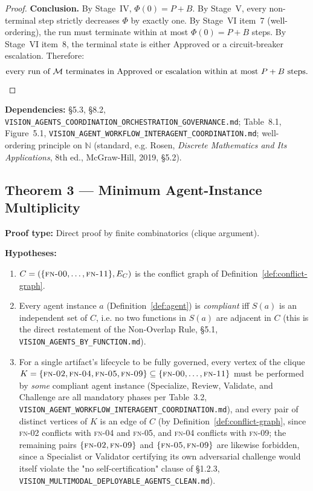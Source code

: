 \documentclass[12pt]{article}
\theoremstyle{definition}
\newcommand{\code}[1]{\texttt{#1}}
\newcommand{\FN}[1]{\textsc{fn-#1}}
\newcommand{\VisionClean}{\code{VISION\_MULTIMODAL\_\allowbreak DEPLOYABLE\_\allowbreak AGENTS\_CLEAN.md}}
\newcommand{\VisionGov}{\code{VISION\_AGENTS\_\allowbreak COORDINATION\_\allowbreak ORCHESTRATION\_\allowbreak GOVERNANCE.md}}
\newcommand{\VisionFunc}{\code{VISION\_AGENTS\_\allowbreak BY\_FUNCTION.md}}
\newcommand{\VisionFlow}{\code{VISION\_AGENT\_\allowbreak WORKFLOW\_\allowbreak INTERAGENT\_\allowbreak COORDINATION.md}}
\begin{document}
\begin{proof}
\medskip
\noindent\textbf{Conclusion.}
By Stage~IV, $\Phi(0) = P + B$.  By Stage~V, every non-terminal step
strictly decreases $\Phi$ by exactly one.  By Stage~VI item~7
(well-ordering), the run must terminate within at most $\Phi(0) = P + B$
steps.  By Stage~VI item~8, the terminal state is either
$\mathrm{Approved}$ or a circuit-breaker escalation.  Therefore:
\begin{equation}
  \label{eq:conclusion}
  \text{every run of } \mathcal{M}
  \text{ terminates in } \mathrm{Approved}
  \text{ or escalation within at most } P + B
  \text{ steps.} \qedhere
\end{equation}
\end{proof}

\begin{sloppypar}
\textbf{Dependencies:} \S5.3, \S8.2,
\VisionGov{}; Table~8.1,
Figure~5.1, \VisionFlow{};
well-ordering principle on $\mathbb{N}$ (standard, e.g. Rosen,
\emph{Discrete Mathematics and Its Applications}, 8th ed., McGraw-Hill,
2019, \S5.2).
\end{sloppypar}

\subsection{Theorem 3 --- Minimum Agent-Instance Multiplicity}

\textbf{Proof type:} Direct proof by finite combinatorics (clique
argument).

\textbf{Hypotheses:}
\begin{enumerate}
    \item[H1] $C = (\{\FN{00},\ldots,\FN{11}\}, E_C)$ is the conflict
              graph of Definition~\ref{def:conflict-graph}.
    \item[H2] Every agent instance $a$ (Definition~\ref{def:agent}) is
              \emph{compliant} iff $S(a)$ is an independent set of $C$,
              i.e. no two functions in $S(a)$ are adjacent in $C$ (this is
              the direct restatement of the Non-Overlap Rule, \S5.1,
              \VisionFunc{}).
    \item[H3] For a single artifact's lifecycle to be fully governed, every
              vertex of the clique
              $K = \{\FN{02},\FN{04},\FN{05},\FN{09}\} \subseteq
              \{\FN{00},\ldots,\FN{11}\}$ must be performed by
              \emph{some} compliant agent instance (Specialize, Review,
              Validate, and Challenge are all mandatory phases per
              Table~3.2, \VisionFlow{}), and every pair of distinct vertices
              of $K$ is an edge of $C$ (by Definition~\ref{def:conflict-graph},
              since \FN{02} conflicts with \FN{04} and \FN{05}, and
              \FN{04} conflicts with \FN{09}; the remaining pairs
              $\{\FN{02},\FN{09}\}$ and $\{\FN{05},\FN{09}\}$ are likewise
              forbidden, since a Specialist or Validator certifying its own
              adversarial challenge would itself violate the "no
              self-certification" clause of \S1.2.3,
              \VisionClean{}).
\end{enumerate}
\end{document}
